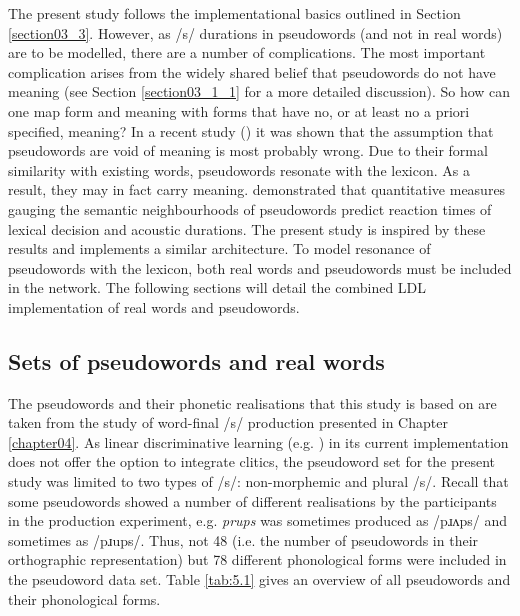 The present study follows the implementational basics outlined in Section \ref{section03_3}. However, as /s/ durations in pseudowords (and not in real words) are to be modelled, there are a number of complications. The most important complication arises from the widely shared belief that pseudowords do not have meaning (see Section \ref{section03_1_1} for a more detailed discussion). So how can one map form and meaning with forms that have no, or at least no a priori specified, meaning? In a recent study (\cite{Chuang2021}) it was shown that the assumption that pseudowords are void of meaning is most probably wrong. Due to their formal similarity with existing words, pseudowords resonate with the lexicon. As a result, they may in fact carry meaning. \citet{Chuang2021} demonstrated that quantitative measures gauging the semantic neighbourhoods of pseudowords predict reaction times of lexical decision and acoustic durations. The present study is inspired by these results and implements a similar architecture. To model resonance of pseudowords with the lexicon, both real words and pseudowords must be included in the network. The following sections will detail the combined LDL implementation of real words and pseudowords.

\subsection{Sets of pseudowords and real words}\label{section05_1_2}

The pseudowords and their phonetic realisations that this study is based on are taken from the study of word-final /s/ production presented in Chapter \ref{chapter04}. As linear discriminative learning (e.g. \cite{Baayen2019}) in its current implementation does not offer the option to integrate clitics, the pseudoword set for the present study was limited to two types of /s/: non-morphemic and plural /s/. Recall that some pseudowords showed a number of different realisations by the participants in the production experiment, e.g. \textit{prups} was sometimes produced as /pɹʌps/ and sometimes as /pɹups/. Thus, not 48 (i.e. the number of pseudowords in their orthographic representation) but 78 different phonological forms were included in the pseudoword data set. Table \ref{tab:5.1} gives an overview of all pseudowords and their phonological forms.

